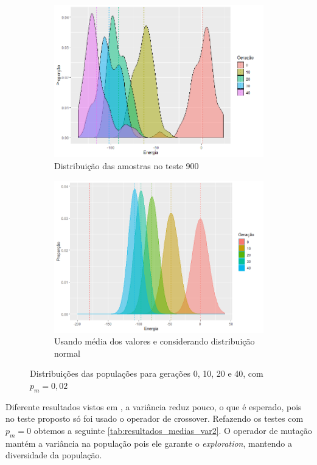 \begin{figure}[ht]
\begin{subfigure}[b]{0.47\linewidth}
		\includegraphics[width=\linewidth]{imagens/distribuicao_t900.png}
		\caption{Distribuição das amostras no teste 900}
	\end{subfigure}
	\begin{subfigure}[b]{0.47\linewidth}
		\includegraphics[width=\linewidth]{imagens/Distribuicao_medias.png}
		\caption{Usando média dos valores e considerando distribuição normal}
	\end{subfigure}
	\caption{Distribuições das populações para gerações 0, 10, 20 e 40, com \(p_m=0,02\)}
	\label{fig:distribuicao_ising_1}
\end{figure}

Diferente resultados vistos em , a variância reduz pouco, o que é esperado, pois no teste proposto só foi usado o operador de crossover. Refazendo os testes com \(p_m = 0\) obtemos a seguinte \autoref{tab:resultados_medias_var2}. O operador de mutação mantém a variância na população pois ele garante o \textit{exploration}, mantendo a diversidade da população.

